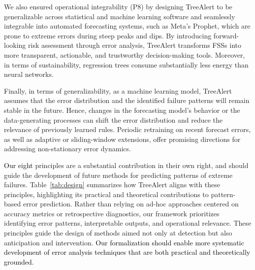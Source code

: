 \documentclass[]{interact}
\theoremstyle{plain}
\theoremstyle{definition}
\theoremstyle{remark}
\newcommand{\galit}[1]{\textcolor{black}{#1}}
\begin{document}
We also ensured operational integrability (P8) by designing TreeAlert to be generalizable
across statistical and machine learning software and seamlessly integrable into automated
forecasting systems, such as Meta's Prophet, which are prone to extreme errors during steep
peaks and dips. By introducing forward-looking risk assessment through error analysis,
TreeAlert transforms FSSs into more transparent, actionable, and trustworthy decision-making
tools. Moreover, in terms of sustainability, regression trees consume substantially less
energy than neural networks.

Finally, in terms of generalizability, as a machine learning model, TreeAlert assumes that
the error distribution and the identified failure patterns will remain stable in the future.
Hence, changes in the forecasting model's behavior or the data-generating processes can
shift the error distribution and reduce the relevance of previously learned rules. Periodic
retraining on recent forecast errors, as well as adaptive or sliding-window extensions,
offer promising directions for addressing non-stationary error dynamics.

\galit{Our eight} principles are a substantial contribution in their own right, and should
guide the development of future methods for predicting patterns of extreme failures.
Table~\ref{tab:design} summarizes how TreeAlert aligns with these principles, highlighting
its practical and theoretical contributions to pattern-based error prediction. Rather than
relying on ad-hoc approaches centered on accuracy metrics or retrospective diagnostics, our
framework prioritizes identifying error patterns, interpretable outputs, and operational
relevance. These principles guide the design of methods aimed not only at detection but also
anticipation and intervention. \galit{Our formalization should enable more systematic
development of error analysis techniques that are both practical and theoretically grounded.}
\end{document}
